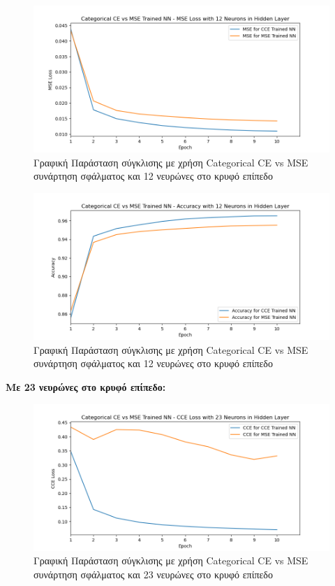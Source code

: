 \documentclass[12pt,a4paper]{article}
\begin{document}
\begin{figure}[H]
	\includegraphics[width=\textwidth]{5. CCE vs MSE - MSE Loss - 12 Neurons.png}
	\caption{Γραφική Παράσταση σύγκλισης με χρήση Categorical CE vs MSE συνάρτηση σφάλματος και 12 νευρώνες στο κρυφό επίπεδο}
\end{figure}

\begin{figure}[H]
	\includegraphics[width=\textwidth]{6. CCE vs MSE - Accuracy - 12 Neurons.png}
	\caption{Γραφική Παράσταση σύγκλισης με χρήση Categorical CE vs MSE συνάρτηση σφάλματος και 12 νευρώνες στο κρυφό επίπεδο}
\end{figure}

\textbf{Με 23 νευρώνες στο κρυφό επίπεδο:}

\begin{figure}[H]
	\includegraphics[width=\textwidth]{7. CCE vs MSE - CCE Loss - 23 Neurons.png}
	\caption{Γραφική Παράσταση σύγκλισης με χρήση Categorical CE vs MSE συνάρτηση σφάλματος και 23 νευρώνες στο κρυφό επίπεδο}
\end{figure}
\end{document}
